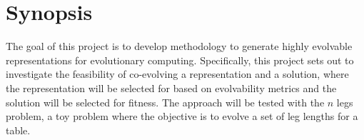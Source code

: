 \section{Synopsis}

The goal of this project is to develop methodology to generate highly evolvable representations for evolutionary computing.
Specifically, this project sets out to investigate the feasibility of co-evolving a representation and a solution, where the representation will be selected for based on evolvability metrics and the solution will be selected for fitness.
The approach will be tested with the $n$ legs problem, a toy problem where the objective is to evolve a set of leg lengths for a table.  
